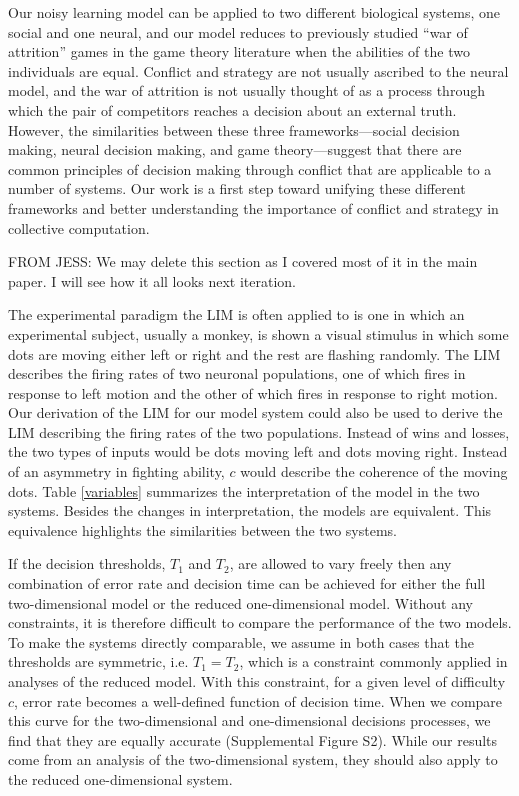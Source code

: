 \documentclass{pnastwo}
\begin{document}
\begin{article}
Our noisy learning model can be applied to two different biological systems, one social and one neural, and our model reduces to previously studied ``war of attrition'' games in the game theory literature when the abilities of the two individuals are equal.  Conflict and strategy are not usually ascribed to the neural model, and the war of attrition is not usually thought of as a process through which the pair of competitors reaches a decision about an external truth.  However, the similarities between these three frameworks---social decision making, neural decision making, and game theory---suggest that there are common principles of decision making through conflict that are applicable to a number of systems.  Our work is a first step toward unifying these different frameworks and better understanding the importance of conflict and strategy in collective computation. 

%
 \label{empirical}
FROM JESS: We may delete this section as I covered most of it in the main paper. I will see how it all looks next iteration.

 \label{neural} 
The experimental paradigm the LIM is often applied to is one in which an experimental subject, usually a monkey, is shown a visual stimulus in which some dots are moving either left or right and the rest are flashing randomly. The LIM describes the firing rates of two neuronal populations, one of which fires in response to left motion and the other of which fires in response to right motion. Our derivation of the LIM for our model system could also be used to derive the LIM describing the firing rates of the two populations. Instead of wins and losses, the two types of inputs would be dots moving left and dots moving right. Instead of an asymmetry in fighting ability, $c$ would describe the coherence of the moving dots. Table \ref{variables} summarizes the interpretation of the model in the two systems. Besides the changes in interpretation, the models are equivalent. This equivalence highlights the similarities between the two systems.

 \label{dimensionality_comp} If the decision thresholds, $T_1$ and $T_2$, are allowed to vary freely then any combination of error rate and decision time can be achieved for either the full two-dimensional model or the reduced one-dimensional model. Without any constraints, it is therefore difficult to compare the performance of the two models. To make the systems directly comparable, we assume in both cases that the thresholds are symmetric, i.e. $T_1=T_2$, which is a constraint commonly applied in analyses of the reduced model.  With this constraint, for a given level of difficulty $c$, error rate becomes a well-defined function of decision time. When we compare this curve for the two-dimensional and one-dimensional decisions processes, we find that they are equally accurate (Supplemental Figure S2).  While our results come from an analysis of the two-dimensional system, they should also apply to the reduced one-dimensional system.


\end{article}
\end{document}

